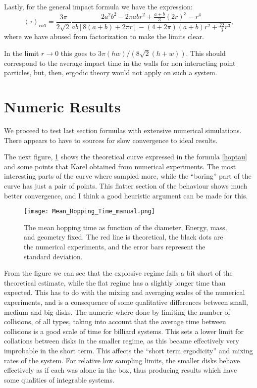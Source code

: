 \documentclass[a4paper,10pt, jcp, aps, preprint]{revtex4-1}
\newcommand{\mean}[1]{\left \langle #1 \right \rangle}
\begin{document}
Lastly, for the general impact formula we have the expression:
\begin{equation}
 \mean{\tau}_{coll} = 	
\frac{3 \pi}{2\sqrt{2}}
\frac { 2a^{2} b^{2}  -  2\pi a b r^{2} + \frac{a+b}{3}(2r)^3 - r^4}
{ab[8(a+b)+2\pi r]- (4+2\pi)(a+b)r^2+\frac{22}{3} r^3},
\end{equation}
where we have abused from factorization to make the limits clear.

In the limit $r\rightarrow 0$ this goes to $3 \pi (hw)/(8\sqrt{2}(h+w))$.
This should correspond to the average impact time in the walls
for non interacting point particles, 
but, then, ergodic theory would not apply
on such a system. 

\section{Numeric Results}

We proceed to test last section formulas with
extensive numerical simulations. There appears to have to
sources for slow convergence to ideal results.

The next figure, \ref{MeanHopp01} shows the theoretical curve 
expressed in the formula \ref{hoptau} and some points
that Karel obtained from numerical experiments. The most interesting
parts of the curve where sampled more, while the ``boring'' part
of the curve has just a pair of points. This flatter section of
the behaviour shows much better convergence, and I think a
good heuristic argument can be made for this.

\begin{figure}[h]
  \centering
  \texttt{[image: Mean\_Hopping\_Time\_manual.png]}
  \caption{The mean hopping time as function of the diameter, Energy, mass, 
and geometry fixed.
The red line is theoretical, the black dots are the numerical experiments, 
and the error bars
represent the standard deviation.}\label{MeanHopp01}
\end{figure}

From the figure we can see that the explosive regime falls a bit short of
the theoretical estimate, while  the flat regime has a slightly longer
time than expected. This has to do with the mixing and averaging scales
of the numerical experiments, and is a consequence of some
qualitative differences between small, medium and big disks. The numeric where done
by limiting the number of collisions, of all types, taking into account
that the average time between collisions is a good scale of time
for billiard systems. This sets a lower limit for collations between
disks in the smaller regime, as this became effectively very
improbable in the short term. This affects the ``short term ergodicity'' and
mixing rates of the system. For relative low sampling limits, the
smaller disks behave effectively as if each was alone in the box, thus
producing results which have some qualities of integrable systems. 
\end{document}
